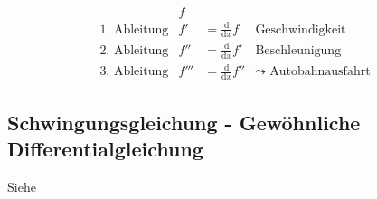 \begin{equation*}
\begin{array}{llll}
	& f \\
	\text{1. Ableitung} & f' &= \frac{\mathrm d}{\mathrm dx}f & \text{Geschwindigkeit} \\
	\text{2. Ableitung} & f'' &= \frac{\mathrm d}{\mathrm dx}f' & \text{Beschleunigung} \\
	\text{3. Ableitung} & f''' &= \frac{\mathrm d}{\mathrm dx}f'' & \leadsto \text{ Autobahnausfahrt}
\end{array}
\end{equation*}

\subsection{Schwingungsgleichung - Gewöhnliche Differentialgleichung}
Siehe \cite[Kap. 8]{bornemann}

